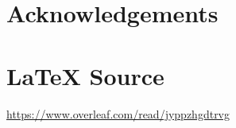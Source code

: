 \documentclass{article}
\theoremstyle{definition}
\begin{document}
\section{Acknowledgements}
\label{sec:acknowledgements}
%
%
\section*{\LaTeX \hspace{0.025 mm} Source}
\url{https://www.overleaf.com/read/jyppzhgdtrvg}
%
%
%


%
%
%
%
%
\end{document}
